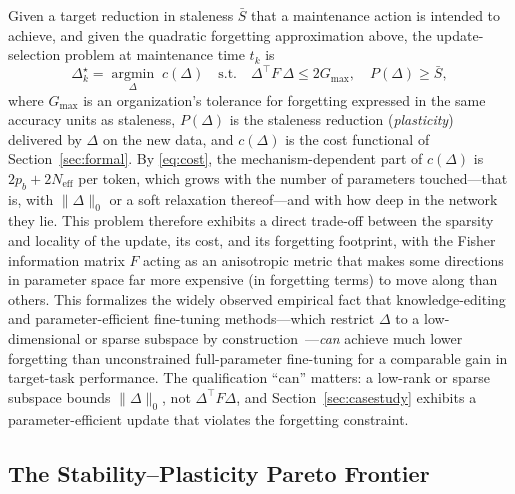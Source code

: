 \documentclass[electronics,article,submit,pdftex,moreauthors]{Definitions/mdpi}
\newcommand{\D}{\varDelta}                 %
\newcommand{\Neff}{N_{\mathrm{eff}}}
\newcommand{\Gmax}{G_{\max}}
\begin{document}
Given a target reduction in staleness $\bar{S}$ that a maintenance action is intended to achieve, and given the quadratic forgetting approximation above, the update-selection problem at maintenance time $t_k$ is
\begin{equation}\label{eq:constrained}
\D_k^\star=\operatorname*{argmin}_{\D}\;c(\D)\quad\text{s.t.}\quad\D^{\top}F\,\D\le 2\Gmax,\quad P(\D)\ge\bar{S},
\end{equation}
where $\Gmax$ is an organization's tolerance for forgetting expressed in the same accuracy units as staleness, $P(\D)$ is the staleness reduction (\textit{plasticity}) delivered by $\D$ on the new data, and $c(\D)$ is the cost functional of Section~\ref{sec:formal}. By \eqref{eq:cost}, the mechanism-dependent part of $c(\D)$ is $2p_b+2\Neff$ per token, which grows with the number of parameters touched---that is, with $\|\D\|_0$ or a soft relaxation thereof---and with how deep in the network they lie. This problem therefore exhibits a direct trade-off between the sparsity and locality of the update, its cost, and its forgetting footprint, with the Fisher information matrix $F$ acting as an anisotropic metric that makes some directions in parameter space far more expensive (in forgetting terms) to move along than others. This formalizes the widely observed empirical fact that knowledge-editing and parameter-efficient fine-tuning methods---which restrict $\D$ to a low-dimensional or sparse subspace by construction~\cite{WangS2024,Zhang2024}---\textit{can} achieve much lower forgetting than unconstrained full-parameter fine-tuning for a comparable gain in target-task performance. The qualification ``can'' matters: a low-rank or sparse subspace bounds $\|\D\|_0$, not $\D^{\top}F\D$, and Section~\ref{sec:casestudy} exhibits a parameter-efficient update that violates the forgetting constraint.

\subsection{The Stability--Plasticity Pareto Frontier}\label{sec:pareto}
\end{document}
